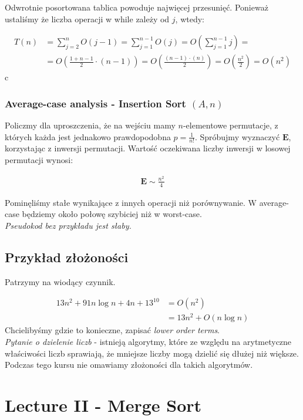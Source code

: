 \documentclass{article}
\begin{document}
Odwrotnie posortowana tablica powoduje najwięcej przesunięć. Ponieważ ustaliśmy że liczba operacji w while zależy od $j$, wtedy:

\begin{align}
    T(n) &= \sum_{j=2}^n O(j-1) = \sum_{j=1}^{n-1} O(j) = O\left(\sum_{j=1}^{n-1} j\right) =\\
    &= O\left(\frac{1+n-1}{2}\cdot (n-1)\right) = O\left(\frac{(n-1)\cdot(n)}{2}\right) = O\left(\frac{n^2}{2}\right) = O(n^2)
\end{align}
c
\subsubsection{Average-case analysis - Insertion Sort $(A,n)$}

Policzmy dla uproszczenia, że na wejściu mamy $n$-elementowe permutacje, z których każda jest jednakowo prawdopodobna $p=\frac{1}{n!}$. Spróbujmy wyznaczyć $\mathbf{E}$, korzystając z inwersji permutacji. Wartość oczekiwana liczby inwersji w losowej permutacji wynosi:

\begin{align}
    \mathbf{E} \sim \frac{n^2}{4}
\end{align}

\noindent
Pominęliśmy stałe wynikające z innych operacji niż porównywanie. W average-case będziemy około połowę szybiciej niż w worst-case.\\

\noindent
\textit{Pseudokod bez przykładu jest słaby.}

\subsection{Przykład złożoności}

Patrzymy na wiodący czynnik.

\begin{align}
    13n^2 + 91n\log n + 4n + 13^{10} &= O(n^2)\\
    &= 13n^2 + O(n\log n)
\end{align}
\noindent
Chcielibyśmy gdzie to konieczne, zapisać \textit{lower order terms}.\\

\noindent
\textit{Pytanie o dzielenie liczb} - istnieją algorytmy, które ze względu na arytmetyczne właściwości liczb sprawiają, że mniejsze liczby mogą dzielić się dłużej niż większe. Podczas tego kursu nie omawiamy złożoności dla takich algorytmów.  

\section{Lecture II - Merge Sort}
\end{document}
